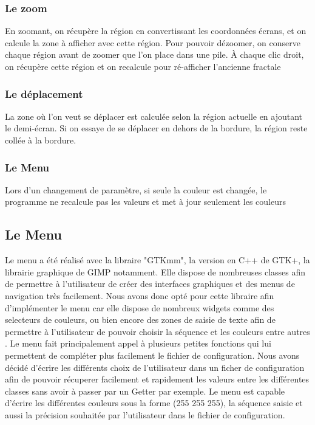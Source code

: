 \documentclass{article}
\begin{document}
	\subsubsection{Le zoom}

	En zoomant, on récupère la région en convertissant les coordonnées écrans, et on calcule la zone à afficher avec cette région.
	Pour pouvoir dézoomer, on conserve chaque région avant de zoomer que l'on place dans une pile.
	À chaque clic droit, on récupère cette région et on recalcule pour ré-afficher l'ancienne fractale

	\subsubsection{Le déplacement}

	La zone où l'on veut se déplacer est calculée selon la région actuelle en ajoutant le demi-écran.
	Si on essaye de se déplacer en dehors de la bordure, la région reste collée à la bordure.

	\subsubsection{Le Menu}

	Lors d'un changement de paramètre, si seule la couleur est changée, le programme ne recalcule pas les valeurs et met à jour seulement les couleurs

	\subsection{Le Menu}
	Le menu a été réalisé avec la libraire "GTKmm", la version en C++ de GTK+, la librairie graphique de GIMP notamment.
	Elle dispose de nombreuses classes afin de permettre à l'utilisateur de créer des interfaces graphiques et des menus de navigation très facilement.
	Nous avons donc opté pour cette libraire afin d'implémenter le menu car elle dispose de nombreux widgets comme des selecteurs de couleurs, ou bien encore des zones de saisie de texte afin de permettre à l'utilisateur de pouvoir choisir la séquence et les couleurs entre autres .
	Le menu fait principalement appel à plusieurs petites fonctions qui lui permettent de compléter plus facilement le fichier de configuration.
	Nous avons décidé d'écrire les différents choix de l'utilisateur dans un ficher de configuration afin de pouvoir récuperer facilement et rapidement les valeurs entre les différentes classes sans avoir à passer par un Getter par exemple.
	Le menu est capable d'écrire les différentes couleurs sous la forme (255 255 255), la séquence saisie et aussi la précision souhaitée par l'utilisateur dans le fichier de configuration.
\end{document}
